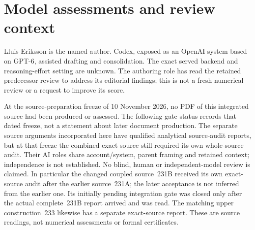 \section{Model assessments and review context}\label{sec:review}
Lluis Eriksson is the named author. Codex, exposed as an OpenAI system based
on GPT-6, assisted drafting and consolidation. The exact served backend
and reasoning-effort setting are unknown. The authoring role has read the
retained predecessor review to address its editorial findings; this is not
a fresh numerical review or a request to improve its score.

At the source-preparation freeze of 10 November 2026, no PDF of this
integrated source had been produced or assessed. The following gate status
records that dated freeze, not a statement about later document production.
The separate source arguments incorporated here have qualified analytical
source-audit reports, but at that freeze the combined exact source still required its own
whole-source audit. Their AI roles share account/system, parent framing
and retained context; independence is not established. No blind, human or
independent-model review is claimed. In particular the changed coupled
source~231B received its own exact-source audit after the earlier source~231A;
the later acceptance is not inferred from the earlier one. Its initially
pending integration gate was closed only after the actual complete~231B
report arrived and was read. The matching upper construction~233 likewise
has a separate exact-source report. These are source readings, not numerical
assessments or formal certificates.

